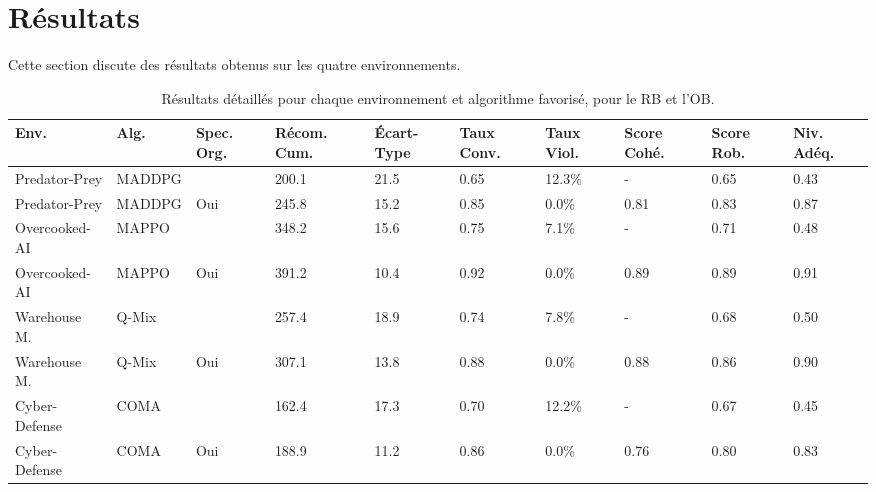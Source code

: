 \documentclass[francais,ROIA,Unicode,manuscript]{cedram}
\begin{document}
\section{Résultats}
\label{sec:results}

Cette section discute des résultats obtenus sur les quatre environnements.

\begin{table}[h!]
    \centering
    \caption{Résultats détaillés pour chaque environnement et algorithme favorisé, pour le RB et l'OB.}
    \label{tab:detailed_results}
    \footnotesize
    \renewcommand{\arraystretch}{1.2}
    \begin{tabular}{p{1.8cm}p{1.1cm}p{.5cm}p{0.7cm}p{0.7cm}p{0.7cm}p{0.7cm}p{0.7cm}p{0.7cm}p{0.7cm}}
        \hline
        \textbf{Env.} & \textbf{Alg.} & \textbf{Spec. Org.} & \textbf{Récom. Cum.} & \textbf{Écart-Type} & \textbf{Taux Conv.} & \textbf{Taux Viol.} & \textbf{Score Cohé.} & \textbf{Score Rob.} & \textbf{Niv. Adéq.} \\ \hline
        Predator-Prey & MADDPG        &                     & 200.1                & 21.5                & 0.65                & 12.3\%              & -                    & 0.65                & 0.43                \\
        Predator-Prey & MADDPG        & Oui                 & 245.8                & 15.2                & 0.85                & 0.0\%               & 0.81                 & 0.83                & 0.87                \\
        Overcooked-AI & MAPPO         &                     & 348.2                & 15.6                & 0.75                & 7.1\%               & -                    & 0.71                & 0.48                \\
        Overcooked-AI & MAPPO         & Oui                 & 391.2                & 10.4                & 0.92                & 0.0\%               & 0.89                 & 0.89                & 0.91                \\
        Warehouse M.  & Q-Mix         &                     & 257.4                & 18.9                & 0.74                & 7.8\%               & -                    & 0.68                & 0.50                \\
        Warehouse M.  & Q-Mix         & Oui                 & 307.1                & 13.8                & 0.88                & 0.0\%               & 0.88                 & 0.86                & 0.90                \\
        Cyber-Defense & COMA          &                     & 162.4                & 17.3                & 0.70                & 12.2\%              & -                    & 0.67                & 0.45                \\
        Cyber-Defense & COMA          & Oui                 & 188.9                & 11.2                & 0.86                & 0.0\%               & 0.76                 & 0.80                & 0.83                \\ \hline
    \end{tabular}
\end{table}
\end{document}
